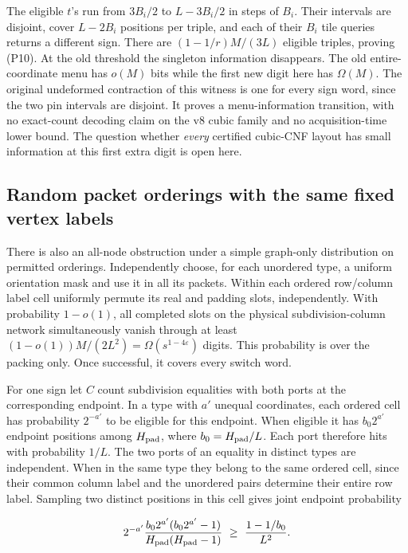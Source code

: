 \documentclass[11pt,a4paper]{article}
\begin{document}
The eligible \(t\)'s run from \(3B_i/2\) to \(L-3B_i/2\) in steps of
\(B_i\). Their intervals are disjoint, cover \(L-2B_i\) positions per
triple, and each of their \(B_i\) tile queries returns a different sign.
There are \((1-1/r)M/(3L)\) eligible triples, proving (P10). At the old
threshold the singleton information disappears. The old
entire-coordinate menu has \(o(M)\) bits while the first new digit here
has \(\Omega(M)\). The original undeformed contraction of this witness
is one for every sign word, since the two pin intervals are disjoint. It
proves a menu-information transition, with no exact-count decoding claim
on the v8 cubic family and no acquisition-time lower bound. The question
whether \emph{every} certified cubic-CNF layout has small information at
this first extra digit is open here.

\subsection{Random packet orderings with the same fixed vertex
labels}\label{v9-random-packet-orderings-with-the-same-fixed-vertex-labels}

There is also an all-node obstruction under a simple graph-only
distribution on permitted orderings. Independently choose, for each
unordered type, a uniform orientation mask and use it in all its
packets. Within each ordered row/column label cell uniformly permute its
real and padding slots, independently. With probability \(1-o(1)\), all
completed slots on the physical subdivision-column network
simultaneously vanish through at least
\((1-o(1))M/(2L^2)=\Omega(s^{1-4\varepsilon})\) digits. This probability
is over the packing only. Once successful, it covers every switch word.

For one sign let \(C\) count subdivision equalities with both ports at
the corresponding endpoint. In a type with \(a'\) unequal coordinates,
each ordered cell has probability \(2^{-a'}\) to be eligible for this
endpoint. When eligible it has \(b_0 2^{a'}\) endpoint positions among
\(H_{\rm pad}\), where \(b_0=H_{\rm pad}/L\). Each port therefore hits
with probability \(1/L\). The two ports of an equality in distinct types
are independent. When in the same type they belong to the same ordered
cell, since their common column label and the unordered pairs determine
their entire row label. Sampling two distinct positions in this cell
gives joint endpoint probability

\[
 2^{-a'}\frac{b_0 2^{a'}(b_0 2^{a'}-1)}
                 {H_{\rm pad}(H_{\rm pad}-1)}
       \ \ge\ \frac{1-1/b_0}{L^2}.
\]
\end{document}

